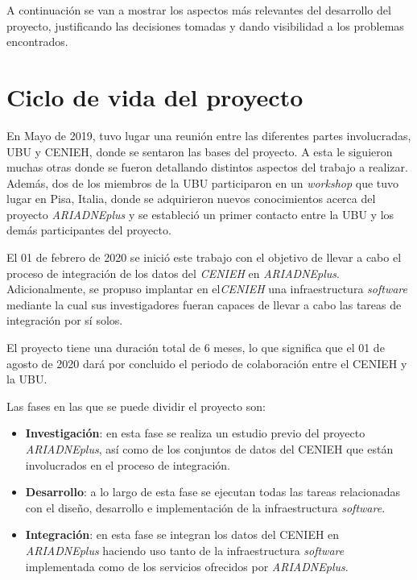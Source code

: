 
A continuación se van a mostrar los aspectos más relevantes del
desarrollo del proyecto, justificando las decisiones tomadas y dando
visibilidad a los problemas encontrados.

\section{Ciclo de vida del proyecto}

En Mayo de 2019, tuvo lugar una reunión entre las diferentes partes involucradas,
UBU y CENIEH, donde se sentaron las bases del proyecto. A esta le siguieron
muchas otras donde se fueron detallando distintos aspectos del trabajo a realizar. 
Además, dos de los miembros de la UBU participaron en un \emph{workshop} que tuvo lugar en Pisa, 
Italia, donde se adquirieron nuevos conocimientos acerca del proyecto \emph{ARIADNEplus} y se
estableció un primer contacto entre la UBU y los demás participantes del proyecto.

El 01 de febrero de 2020 se inició este trabajo con el objetivo de
llevar a cabo el proceso de integración de los datos del \emph{CENIEH} en
\emph{ARIADNEplus}. Adicionalmente, se propuso implantar en el\emph{CENIEH} una
infraestructura \emph{software} mediante la cual sus investigadores
fueran capaces de llevar a cabo las tareas de integración por sí
solos. 

El proyecto tiene una duración total de 6 meses, lo que significa
que el 01 de agosto de 2020 dará por concluido el periodo de colaboración entre
el CENIEH y la UBU. 

Las fases en las que se puede dividir el proyecto son:

\begin{itemize}
\tightlist
\item
  \textbf{Investigación}: en esta fase se realiza un estudio previo del
  proyecto \emph{ARIADNEplus}, así como de los conjuntos de datos del CENIEH
  que están involucrados en el proceso de integración.
\item
  \textbf{Desarrollo}: a lo largo de esta fase se ejecutan todas las
  tareas relacionadas con el diseño, desarrollo e implementación de la
  infraestructura \emph{software}.
\item
  \textbf{Integración}: en esta fase se integran los datos del CENIEH en
  \emph{ARIADNEplus} haciendo uso tanto de la infraestructura \emph{software}
  implementada como de los servicios ofrecidos por \emph{ARIADNEplus}.
\end{itemize}


